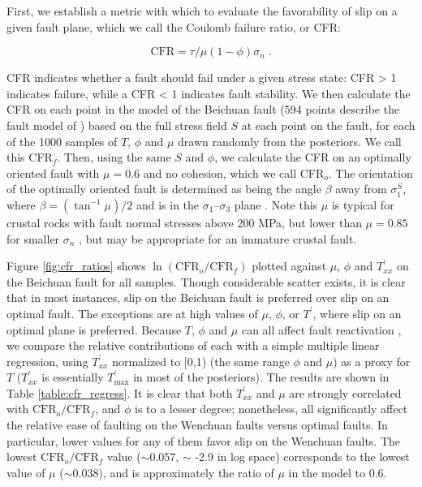 \documentclass[draft,jgrga]{AGUTeX}
\begin{document}
\begin{article}
First, we establish a metric with which to evaluate the favorability of
slip on a given fault plane, which we call the Coulomb failure ratio, or
CFR:

\begin{equation}
\mathrm{CFR} = \tau / \mu (1 - \phi) \sigma_n \; .
\label{eqn:cfr}
\end{equation}

CFR indicates whether a fault should fail under a given stress state:
CFR \textgreater{} 1 indicates failure, while a CFR \textless{} 1
indicates fault stability. We then calculate the CFR on each point in
the model of the Beichuan fault (594 points describe the fault model of
\citet{zhang2011}) based on the full stress field $S$ at
each point on the fault, for each of the 1000 samples of $T$, $\phi$ and
$\mu$ drawn randomly from the posteriors. We call this CFR$_f$. Then,
using the same $S$ and $\phi$, we calculate the CFR on an optimally
oriented fault with $\mu=0.6$ and no cohesion, which we call CFR$_o$.
The orientation of the optimally oriented fault is determined as being
the angle $\beta$ away from $\sigma^S_1$, where $\beta = (\tan^{-1} \mu) / 2$
and is in the $\sigma_1$--$\sigma_3$ plane \citep[e.g.,][]{sibson1985}.
Note this $\mu$ is typical for crustal rocks with fault normal stresses
above 200 MPa, but lower than $\mu = 0.85$ for smaller $\sigma_n$
\citep{byerlee1978}, but may be appropriate for an immature crustal
fault.

Figure \ref{fig:cfr_ratios} shows
$\ln (\mathrm{CFR}_o / \mathrm{CFR}_f)$ plotted against $\mu$, $\phi$
and $T^\prime_{xx}$ on the Beichuan fault for all samples. Though
considerable scatter exists, it is clear that in most instances, slip on
the Beichuan fault is preferred over slip on an optimal fault. The
exceptions are at high values of $\mu$, $\phi$, or $T^\prime$, where
slip on an optimal plane is preferred. Because $T$, $\phi$ and $\mu$ can
all affect fault reactivation \citep[e.g.,][]{sibson1985}, we compare the
relative contributions of each with a simple multiple linear regression,
using $T^\prime_{xx}$ normalized to [0,1) (the same range $\phi$ and
$\mu$) as a proxy for $T$ ($T^\prime_{xx}$ is essentially
$T^\prime_{\mathrm{max}}$ in most of the posteriors). The results are
shown in Table \ref{table:cfr_regress}. It is clear that both $T^\prime_{xx}$
and $\mu$ are strongly correlated with $\mathrm{CFR}_o/\mathrm{CFR}_f$, and $\phi$ is to a lesser degree; nonetheless, all
significantly affect the relative ease of faulting on the Wenchuan faults
versus optimal faults. In particular, lower values for any of them favor slip
on the Wenchuan faults. The lowest $\mathrm{CFR}_o/\mathrm{CFR}_f$ value
($\sim$0.057, $\sim$ -2.9 in log space) corresponds to the lowest value of
$\mu$ ($\sim$0.038), and is approximately the ratio of $\mu$ in the model
to 0.6.


\end{article}
\end{document}
